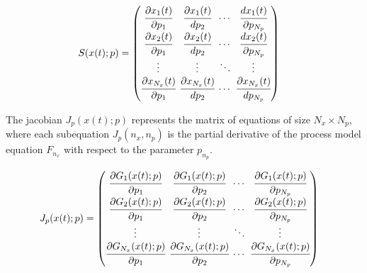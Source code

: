 \documentclass[../Article_Design_of_Experiment.tex]{subfiles}
\begin{document}
	{\footnotesize
		\begin{equation}
			\begin{split}
				{S}({x}(t);{p}) & = 
				\begingroup %
				\setlength\arraycolsep{2pt}
				\begin{pmatrix}
					\cfrac{\partial {x_{1}}(t)}{\partial {p_{1}}} 	& \cfrac{\partial {x_{1}}(t)}{d {p_{2}}}     & \cdots & \cfrac{d {x_{1}}(t)}{\partial {p_{N_p}}}\\
					\cfrac{\partial {x_{2}}(t)}{\partial {p_{1}}} 	& \cfrac{\partial {x_{2}}(t)}{d {p_{2}}}     & \cdots & \cfrac{d {x_{2}}(t)}{\partial {p_{N_p}}}\\
					\vdots					 	    & \vdots 					   	  & \ddots & \vdots\\
					\cfrac{\partial {x_{N_x}}(t)}{\partial {p_{1}}} 	& \cfrac{\partial {x_{N_x}}(t)}{d {p_{2}}}     & \cdots & \cfrac{\partial {x_{N_x}}(t)}{d {p_{N_p}}}
				\end{pmatrix} 
				\endgroup
			\end{split}
	\end{equation} }
	
	The jacobian ${J_p}({x}(t);{p})$ represents the matrix of equations of size $N_x \times N_p$, where each subequation ${J_p}(n_x,n_p)$ is the partial derivative of the process model equation $F_{n_x}$ with respect to the parameter $p_{n_p}$.
	
	{\footnotesize
		\begin{align}
			{J_p}({x}(t);{p}) & =
			\begingroup %
			\setlength\arraycolsep{2pt}
			\begin{pmatrix}
				\cfrac{\partial {G_{1}}({x}(t);{p})}{\partial {p_{1}}} & \cfrac{\partial {G_{1}}({x}(t);{p})}{\partial {p_{2}}} & \cdots & \cfrac{\partial {G_{1}}({x}(t);{p})}{\partial {p_{N_p}}}\\
				\cfrac{\partial {G_{2}}({x}(t);{p})}{\partial {p_{1}}} & \cfrac{\partial {G_{2}}({x}(t);{p})}{\partial {p_{2}}} & \cdots & \cfrac{\partial {G_{2}}({x}(t);{p})}{\partial {p_{N_p}}}\\
				\vdots & \vdots & \ddots & \vdots\\
				\cfrac{\partial {G_{N_x}}({x}(t);{p})}{\partial {p_{1}}} & \cfrac{\partial {G_{N_x}}({x}(t);{p})}{\partial {p_{2}}} & \cdots & \cfrac{\partial {G_{N_x}}({x}(t);{p})}{\partial {p_{N_p}}}
			\end{pmatrix}
			\endgroup
	\end{align}}
	
\end{document}
